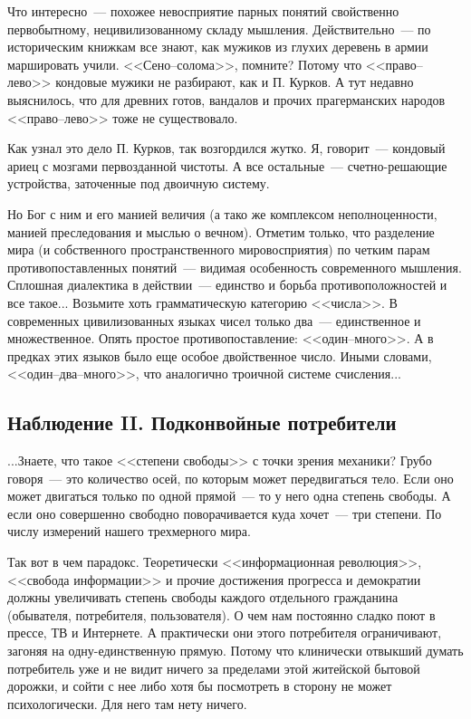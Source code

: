 \documentclass{scrbook}
\newcommand{\flqq}{<<}
\newcommand{\frqq}{>>}
\newcommand{\mdash}{~--- }
\newcommand{\ndash}{--}
\newcommand{\essaysection}[1]{\subsection*{#1}\nopagebreak}
\begin{document}
Что интересно{\mdash}похожее невосприятие парных понятий свойственно первобытному, нецивилизованному складу мышления. Действительно{\mdash}по историческим книжкам все знают, как мужиков из глухих деревень в армии маршировать учили. {\flqq}Сено{\ndash}солома{\frqq}, помните? Потому что {\flqq}право{\ndash}лево{\frqq} кондовые мужики не разбирают, как и П. Курков. А тут недавно выяснилось, что для древних готов, вандалов и прочих прагерманских народов {\flqq}право{\ndash}лево{\frqq} тоже не существовало.

Как узнал это дело П. Курков, так возгордился жутко. Я, говорит{\mdash}кондовый ариец с мозгами первозданной чистоты. А все остальные{\mdash}счетно-решающие устройства, заточенные под двоичную систему.

Но Бог с ним и его манией величия (а тако же комплексом неполноценности, манией преследования и мыслью о вечном). Отметим только, что разделение мира (и собственного пространственного мировосприятия) по четким парам противопоставленных понятий{\mdash}видимая особенность современного мышления. Сплошная диалектика в действии{\mdash}единство и борьба противоположностей и все такое... Возьмите хоть грамматическую категорию {\flqq}числа{\frqq}. В современных цивилизованных языках чисел только два{\mdash}единственное и множественное. Опять простое противопоставление: {\flqq}один{\ndash}много{\frqq}. А в предках этих языков было еще особое двойственное число. Иными словами, {\flqq}один{\ndash}два{\ndash}много{\frqq}, что аналогично троичной системе счисления...

\essaysection{Наблюдение II. Подконвойные потребители}

...Знаете, что такое {\flqq}степени свободы{\frqq} с точки зрения механики? Грубо говоря{\mdash}это количество осей, по которым может передвигаться тело. Если оно может двигаться только по одной прямой{\mdash}то у него одна степень свободы. А если оно совершенно свободно поворачивается куда хочет{\mdash}три степени. По числу измерений нашего трехмерного мира.

Так вот в чем парадокс. Теоретически {\flqq}информационная революция{\frqq}, {\flqq}свобода информации{\frqq} и прочие достижения прогресса и демократии должны увеличивать степень свободы каждого отдельного гражданина (обывателя, потребителя, пользователя). О чем нам постоянно сладко поют в прессе, ТВ и Интернете. А практически они этого потребителя ограничивают, загоняя на одну-единственную прямую. Потому что клинически отвыкший думать потребитель уже и не видит ничего за пределами этой житейской бытовой дорожки, и сойти с нее либо хотя бы посмотреть в сторону не может психологически. Для него там нету ничего.
\end{document}
